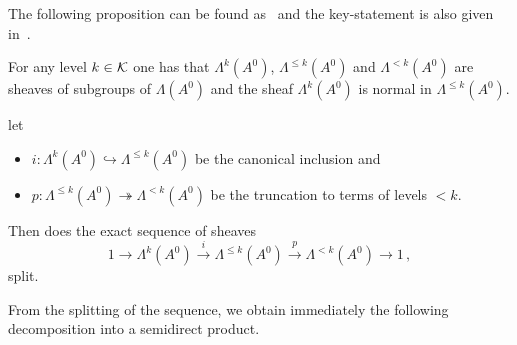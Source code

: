 The following proposition can be found as~\cite[Prop.I.5.1]{Loday1994} and the
key-statement is also given in~\cite[Prop.4.10]{Martinet1991}.
\begin{prop}\label{prop:PropertiesOfStokesSheafSplitting}
  For any level $k\in\mathcal{K}$ one has that $\Lambda^{k}(A^0)$,
  $\Lambda^{\leq k}(A^0)$ and $\Lambda^{<k}(A^0)$ are sheaves of subgroups of
  $\Lambda(A^0)$ and the sheaf $\Lambda^k(A^0)$ is normal in
  $\Lambda^{\leq k}(A^0)$.
  \begin{comment}
    A subgroup $N$ is normal in $G$ ($N\vartriangleleft G$) if it is stable
    under conjugation, i.e.
    \[
      N\vartriangleleft G \Leftrightarrow \forall n\in N \forall g\in G,
      gng^{-1}\in N ,.
    \]
  \end{comment}

   let
  \begin{itemize}
    \item $i:\Lambda^k(A^0)\hookrightarrow\Lambda^{\leq k}(A^0)$ be the
      canonical inclusion and
    \item $p:\Lambda^{\leq k}(A^0)\twoheadrightarrow\Lambda^{<k}(A^0)$ be the
      truncation to terms of levels $<k$.
  \end{itemize}
  Then does the exact sequence of sheaves
  \[
    1\longrightarrow\Lambda^k(A^0)
    \overset{i}\longrightarrow\Lambda^{\leq k}(A^0)
    \overset{p}\longrightarrow\Lambda^{<k}(A^0)
    \longrightarrow 1 \,,
  \]
  split.
\end{prop}
From the splitting of the sequence, we obtain immediately the following
decomposition into a semidirect product.
